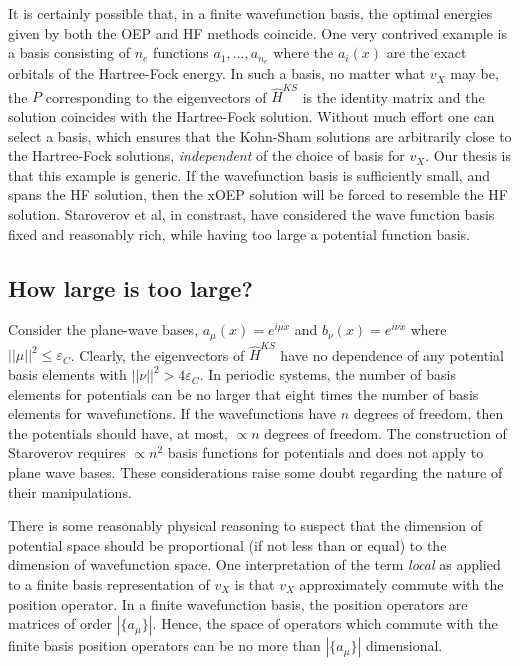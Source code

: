 \documentclass{article}
\newcommand{\norm}[1]{\left|\left|{#1}\right|\right|}
\begin{document}
It is certainly possible that, in a finite wavefunction basis, the optimal
energies given by both the OEP and HF methods coincide.  One very contrived
example is a basis consisting of $n_e$ functions $a_{1},\ldots,a_{n_e}$
where the $a_i(x)$ are the exact orbitals of the Hartree-Fock energy.
In such a basis, no matter what $v_X$ may be, the $P$ corresponding to
the eigenvectors of $\hat{H}^{KS}$ is the identity matrix and the
solution coincides with the Hartree-Fock solution.  Without much
effort one can select a basis, which ensures that the Kohn-Sham solutions
are arbitrarily close to the Hartree-Fock solutions, {\em independent} of the
choice of basis for $v_X$.  Our thesis is that this example is generic.
If the wavefunction basis is sufficiently small, and spans the HF
solution, then the xOEP solution will be forced to resemble the HF solution.
Staroverov et al, in constrast, have considered the wave function basis
fixed and reasonably rich, while having too large a potential function basis.

\subsection{How large is too large?}

Consider the plane-wave bases, $a_\mu(x) = e^{i \mu \dot x}$ and
$b_\nu(x) = e^{i \nu \dot x}$ where $\norm{\mu}^2 \le \varepsilon_C$.
Clearly, the eigenvectors of $\hat{H}^{KS}$ have no dependence of any
potential basis elements with $\norm{\nu}^2 > 4 \varepsilon_C$.
In periodic systems, the number of basis elements for potentials
can be no larger that eight times the number of basis elements for
wavefunctions.  If the wavefunctions have $n$ degrees of freedom,
then the potentials should have, at most, $\propto n$ degrees of freedom.
The construction of Staroverov requires $\propto n^2$ basis functions
for potentials and does not apply to plane wave bases.  These considerations
raise some doubt regarding the nature of their manipulations.

There is some reasonably physical reasoning to suspect that the
dimension of potential space should be proportional (if not less than
or equal) to the dimension of wavefunction space.  One interpretation
of the term {\em local} as applied to a finite basis representation of
$v_X$ is that $v_X$ approximately commute with the position operator.
In a finite wavefunction basis, the position operators are matrices of
order $|\{a_{\mu}\}|$.  Hence, the space of operators which commute
with the finite basis position operators can be no more than
$|\{a_{\mu}\}|$ dimensional.
\end{document}
